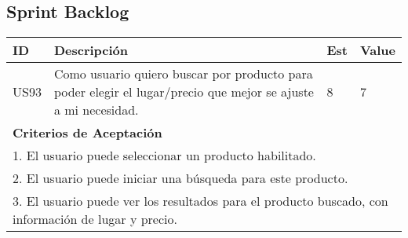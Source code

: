 \documentclass[a4paper,8pt]{article}
\begin{document}
\subsection{Sprint Backlog}


\begin{tabular}{|p{1cm}|p{10cm}|p{1cm}|p{1cm}|}
\hline
\hline
\textbf{ID}&\textbf{Descripción}&\textbf{Est}&\textbf{Value}\\
\hline
\hline
US93&Como usuario quiero buscar por producto para poder elegir el lugar/precio que mejor se ajuste a mi necesidad.& 8& 7\\
\hline
\hline
\multicolumn{4}{|p{13cm}|}{ \textbf{Criterios de Aceptación}} \\
\hline
\hline
\multicolumn{4}{|p{13cm}|}{1. El usuario puede seleccionar un producto habilitado.}\\
\multicolumn{4}{|p{13cm}|}{2.  El usuario puede iniciar una búsqueda para este producto.}\\
\multicolumn{4}{|p{13cm}|}{3. El usuario puede ver los resultados para el producto buscado, con información de lugar y precio.}\\
\hline
\hline
\end{tabular}
\newpage
\end{document}
